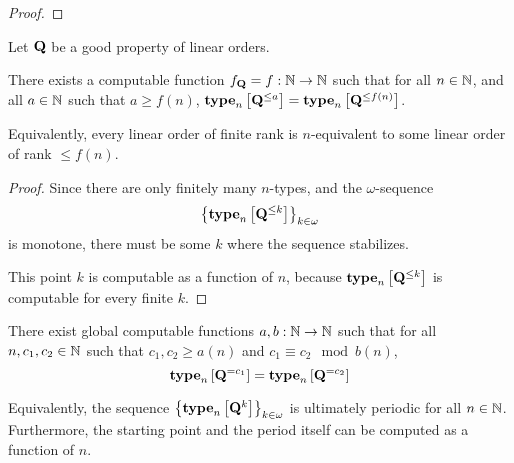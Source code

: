 \begin{proof}
  
\end{proof}

\begin{lemma}\label{f-lemma}
  Let $\mathbf{Q}$ be a good property of linear orders.

  There exists a computable function $f_{\mathbf{Q}} = f: \mathbb{N} \to \mathbb{N}$ such that
  for all $n \in \mathbb{N}$, and all $a \in \mathbb{N}$ such that $a \ge f(n)$,
  $\mathbf{type}_{n} \left[ {\mathbf{Q}^{\le a}} \right] = \mathbf{type}_{n} \left[ {\mathbf{Q}^{\le f(n)}} \right]$.

  Equivalently, every linear order of finite rank is $n$-equivalent to some linear order of rank $\le f(n)$.
\end{lemma}

\begin{proof}
  Since there are only finitely many $n$-types,
  and the $\omega$-sequence \[\left\{ {\mathbf{type}_{n} \left[ {\mathbf{Q}^{\le k}} \right]} \right\}_{k \in \omega}\]
  is monotone,
  there must be some $k$ where the sequence stabilizes.

  This point $k$ is computable as a function of $n$, because
  $\mathbf{type}_{n} \left[ {\mathbf{Q}^{\le k}} \right]$ is computable for every finite $k$.
\end{proof}

\begin{lemma}\label{ab-lemma}
  There exist global computable functions $a, b : \mathbb{N} \to \mathbb{N}$ such that
  for all $n, c_1, c_2 \in \mathbb{N}$ such that $c_1, c_2 \ge a(n)$ and $c_1 \equiv c_2 \mod b(n)$,
  \[\mathbf{type}_{n} \left[ {\mathbf{Q}^{= c_1}} \right] = \mathbf{type}_{n} \left[ {\mathbf{Q}^{= c_2}} \right]\]

  Equivalently, the sequence $\left\{ {\mathbf{type}_{n} \left[ {\mathbf{Q}^{k}} \right]} \right\}_{k \in \omega}$
  is ultimately periodic for all $n \in \mathbb{N}$. Furthermore, the starting point and the period
  itself can be computed as a function of $n$.
\end{lemma}

